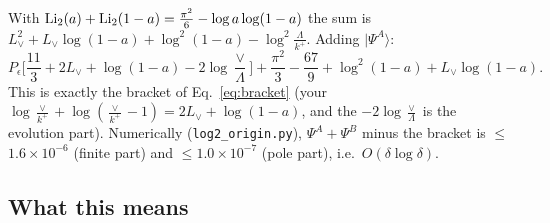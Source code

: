 \documentclass[10pt]{article}
\numberwithin{equation}{section}
\newcommand{\Lv}{L_{\vee}}
\begin{document}
With ${\rm Li}_2(a)+{\rm Li}_2(1-a)=\frac{\pi^2}{6}-\log a\log(1-a)$ the sum is $\Lv^2+\Lv\log(1-a)+\log^2(1-a)-\log^2\frac{\Lambda}{k^+}$. Adding $|\Psi^A\rangle$:
\begin{equation}
P_\epsilon\Big[\frac{11}{3}+2\Lv+\log(1-a)-2\log\frac{\vee}{\Lambda}\Big]+\frac{\pi^2}{3}-\frac{67}{9}+\log^2(1-a)+\Lv\log(1-a).
\end{equation}
This is exactly the bracket of Eq.~\eqref{eq:bracket} (your $\log\frac{\vee}{k^+}+\log(\frac{\vee}{k^+}-1)=2\Lv+\log(1-a)$, and the $-2\log\frac\vee\Lambda$ is the evolution part). Numerically (\texttt{log2\_origin.py}), $\Psi^A+\Psi^B$ minus the bracket is $\le$$1.6\times10^{-6}$ (finite part) and $\le$$1.0\times10^{-7}$ (pole part), i.e.\ $O(\delta\log\delta)$.

\subsection{What this means}
\end{document}
